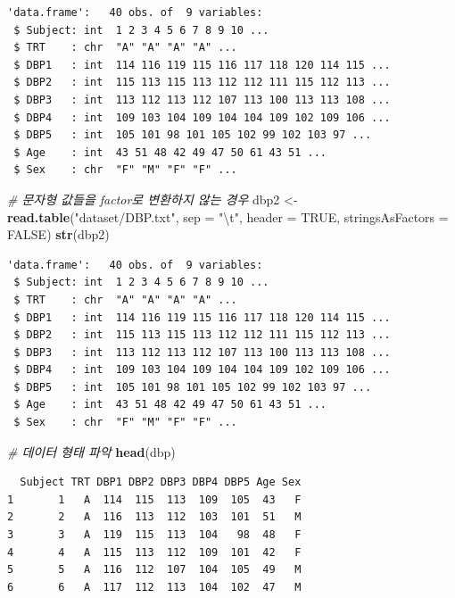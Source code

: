 \documentclass[
  11pt,
]{krantz}
\newenvironment{Shaded}{\begin{snugshade}}{\end{snugshade}}
\newcommand{\CharTok}[1]{\textcolor[rgb]{0.5,0.5,0.5}{#1}}
\newcommand{\CommentTok}[1]{\textcolor[rgb]{0.37,0.37,0.37}{\textit{#1}}}
\newcommand{\DataTypeTok}[1]{\textcolor[rgb]{0.27,0.27,0.27}{#1}}
\newcommand{\KeywordTok}[1]{\textcolor[rgb]{0.27,0.27,0.27}{\textbf{#1}}}
\newcommand{\NormalTok}[1]{#1}
\newcommand{\OtherTok}[1]{\textcolor[rgb]{0.37,0.37,0.37}{#1}}
\newcommand{\StringTok}[1]{\textcolor[rgb]{0.5,0.5,0.5}{#1}}
\begin{document}
\begin{verbatim}
'data.frame':   40 obs. of  9 variables:
 $ Subject: int  1 2 3 4 5 6 7 8 9 10 ...
 $ TRT    : chr  "A" "A" "A" "A" ...
 $ DBP1   : int  114 116 119 115 116 117 118 120 114 115 ...
 $ DBP2   : int  115 113 115 113 112 112 111 115 112 113 ...
 $ DBP3   : int  113 112 113 112 107 113 100 113 113 108 ...
 $ DBP4   : int  109 103 104 109 104 104 109 102 109 106 ...
 $ DBP5   : int  105 101 98 101 105 102 99 102 103 97 ...
 $ Age    : int  43 51 48 42 49 47 50 61 43 51 ...
 $ Sex    : chr  "F" "M" "F" "F" ...
\end{verbatim}

\begin{Shaded}
\begin{Highlighting}[]
\CommentTok{# 문자형 값들을 factor로 변환하지 않는 경우}
\NormalTok{dbp2 <-}\StringTok{ }\KeywordTok{read.table}\NormalTok{(}\StringTok{"dataset/DBP.txt"}\NormalTok{, }\DataTypeTok{sep =} \StringTok{"}\CharTok{\textbackslash{}t}\StringTok{"}\NormalTok{, }
                   \DataTypeTok{header =} \OtherTok{TRUE}\NormalTok{, }
                   \DataTypeTok{stringsAsFactors =} \OtherTok{FALSE}\NormalTok{)}
\KeywordTok{str}\NormalTok{(dbp2)}
\end{Highlighting}
\end{Shaded}

\begin{verbatim}
'data.frame':   40 obs. of  9 variables:
 $ Subject: int  1 2 3 4 5 6 7 8 9 10 ...
 $ TRT    : chr  "A" "A" "A" "A" ...
 $ DBP1   : int  114 116 119 115 116 117 118 120 114 115 ...
 $ DBP2   : int  115 113 115 113 112 112 111 115 112 113 ...
 $ DBP3   : int  113 112 113 112 107 113 100 113 113 108 ...
 $ DBP4   : int  109 103 104 109 104 104 109 102 109 106 ...
 $ DBP5   : int  105 101 98 101 105 102 99 102 103 97 ...
 $ Age    : int  43 51 48 42 49 47 50 61 43 51 ...
 $ Sex    : chr  "F" "M" "F" "F" ...
\end{verbatim}

\begin{Shaded}
\begin{Highlighting}[]
\CommentTok{# 데이터 형태 파악}
\KeywordTok{head}\NormalTok{(dbp)}
\end{Highlighting}
\end{Shaded}

\begin{verbatim}
  Subject TRT DBP1 DBP2 DBP3 DBP4 DBP5 Age Sex
1       1   A  114  115  113  109  105  43   F
2       2   A  116  113  112  103  101  51   M
3       3   A  119  115  113  104   98  48   F
4       4   A  115  113  112  109  101  42   F
5       5   A  116  112  107  104  105  49   M
6       6   A  117  112  113  104  102  47   M
\end{verbatim}
\end{document}
